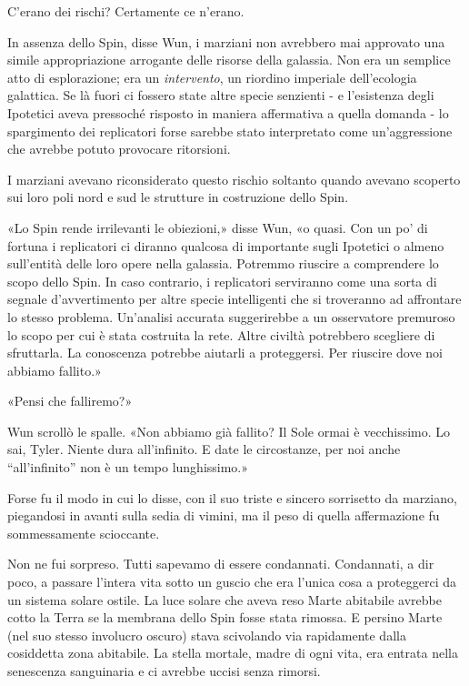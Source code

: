 C'erano dei rischi? Certamente ce n'erano.

In assenza dello Spin, disse Wun, i marziani non avrebbero mai approvato
una simile appropriazione arrogante delle risorse della galassia. Non
era un semplice atto di esplorazione; era un \emph{intervento}, un
riordino imperiale dell'ecologia galattica. Se là fuori ci fossero state
altre specie senzienti - e l'esistenza degli Ipotetici aveva pressoché
risposto in maniera affermativa a quella domanda - lo spargimento dei
replicatori forse sarebbe stato interpretato come un'aggressione che
avrebbe potuto provocare ritorsioni.

I marziani avevano riconsiderato questo rischio soltanto quando avevano
scoperto sui loro poli nord e sud le strutture in costruzione dello
Spin.

«Lo Spin rende irrilevanti le obiezioni,» disse Wun, «o quasi. Con un
po' di fortuna i replicatori ci diranno qualcosa di importante sugli
Ipotetici o almeno sull'entità delle loro opere nella galassia. Potremmo
riuscire a comprendere lo scopo dello Spin. In caso contrario, i
replicatori serviranno come una sorta di segnale d'avvertimento per
altre specie intelligenti che si troveranno ad affrontare lo stesso
problema. Un'analisi accurata suggerirebbe a un osservatore premuroso lo
scopo per cui è stata costruita la rete. Altre civiltà potrebbero
scegliere di sfruttarla. La conoscenza potrebbe aiutarli a proteggersi.
Per riuscire dove noi abbiamo fallito.»

«Pensi che falliremo?»

Wun scrollò le spalle. «Non abbiamo già fallito? Il Sole ormai è
vecchissimo. Lo sai, Tyler. Niente dura all'infinito. E date le
circostanze, per noi anche ``all'infinito'' non è un tempo lunghissimo.»

Forse fu il modo in cui lo disse, con il suo triste e sincero sorrisetto
da marziano, piegandosi in avanti sulla sedia di vimini, ma il peso di
quella affermazione fu sommessamente scioccante.

Non ne fui sorpreso. Tutti sapevamo di essere condannati. Condannati, a
dir poco, a passare l'intera vita sotto un guscio che era l'unica cosa a
proteggerci da un sistema solare ostile. La luce solare che aveva reso
Marte abitabile avrebbe cotto la Terra se la membrana dello Spin fosse
stata rimossa. E persino Marte (nel suo stesso involucro oscuro) stava
scivolando via rapidamente dalla cosiddetta zona abitabile. La stella
mortale, madre di ogni vita, era entrata nella senescenza sanguinaria e
ci avrebbe uccisi senza rimorsi.

